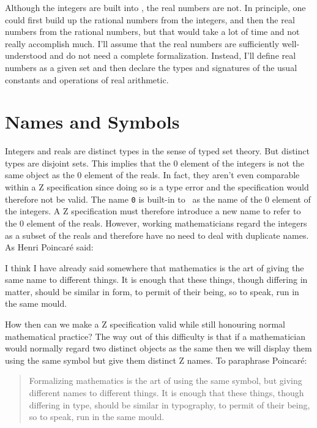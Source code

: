 \documentclass{amsart}
\begin{document}
Although the integers are built into \ZN, the real numbers are not.
In principle, one could first build up the rational numbers from the integers,
and then the real numbers from the rational numbers, but that would take a lot of time and not really
accomplish much.
I'll assume that the real numbers are sufficiently well-understood and do not need a complete formalization.
Instead, I'll define real numbers as a given set and then declare the types and signatures of the usual constants and operations of real arithmetic.

\section{Names and Symbols}

Integers and reals are distinct types in the sense of typed set theory.
But distinct types are disjoint sets.
This implies that the $0$ element of the integers is not the same object as the $0$ element of the reals.
In fact, they aren't even comparable within a Z specification since doing so is a type error and the 
specification would therefore not be valid.
The name \texttt{0} is built-in to \ZN\  as the name of the $0$ element of the integers.
A Z specification must therefore introduce a new name to refer to the $0$ element of the reals.
However, working mathematicians regard the integers as a subset of the reals and therefore have no need to deal with duplicate names.
As Henri Poincar\'{e} \cite{poincare-fm} said:
\begin{displayquote}
I think I have already said somewhere that mathematics is the art of giving the same name to different things. 
It is enough that these things, though differing in matter, should be similar in form, to permit of their being, so to speak, run in the same mould.\end{displayquote}

How then can we make a Z specification valid while still honouring normal mathematical practice?
The way out of this difficulty is that if a mathematician would normally regard two distinct objects as the same
then we will display them using the same symbol but give them distinct Z  names.
To paraphrase Poincar\'{e}:
\begin{quote}
Formalizing mathematics is the art of using the same symbol, but giving different names to different things. 
It is enough that these things, though differing in type, should be similar in typography, 
to permit of their being, so to speak, run in the same mould.
\end{quote}
\end{document}
